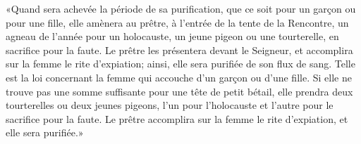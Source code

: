 «Quand sera achevée la période de sa purification,
	que ce soit pour un garçon ou pour une fille,
	elle amènera au prêtre, à l’entrée de la tente de la Rencontre,
	un agneau de l’année pour un holocauste,
	un jeune pigeon ou une tourterelle, en sacrifice pour la faute.
Le prêtre les présentera devant le Seigneur,
	et accomplira sur la femme le rite d’expiation;
	ainsi, elle sera purifiée de son flux de sang.
Telle est la loi concernant la femme qui accouche d’un garçon ou d’une fille.
Si elle ne trouve pas une somme suffisante pour une tête de petit bétail,
	elle prendra deux tourterelles ou deux jeunes pigeons,
	l’un pour l’holocauste et l’autre pour le sacrifice pour la faute.
Le prêtre accomplira sur la femme le rite d’expiation, et elle sera purifiée.»
